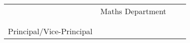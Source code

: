 \documentclass[14pt]{extarticle}
\begin{document}
\vspace{2.1cm}

\begin{tabu} to 1\textwidth {X[l] X[r]}
  & Maths Department\ \ \ \  \\
 \\ \\ 
  Principal/Vice-Principal&
\end{tabu}
\end{document}
